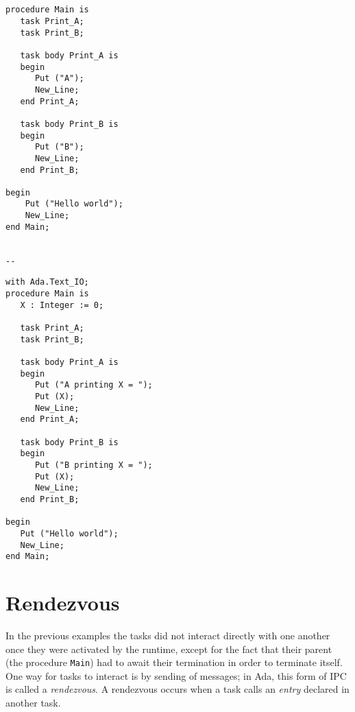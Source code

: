 \begin{minipage}{0.45\linewidth}
\lstset{language=ada}
\begin{lstlisting}[caption=Tasks in a procedure.,label=tasks_in_proc]


procedure Main is
   task Print_A;
   task Print_B;

   task body Print_A is
   begin
      Put ("A");
      New_Line;
   end Print_A;

   task body Print_B is
   begin
      Put ("B");
      New_Line;
   end Print_B;

begin
	Put ("Hello world");
	New_Line;
end Main;


--
\end{lstlisting}
\end{minipage}
\hspace{5mm}
\begin{minipage}{0.45\linewidth}
\lstset{language=ada}
\begin{lstlisting}[caption=Sharing of data in tasks.,label=shared_data]
with Ada.Text_IO;
procedure Main is
   X : Integer := 0;

   task Print_A;
   task Print_B;

   task body Print_A is
   begin
      Put ("A printing X = ");
      Put (X);
      New_Line;
   end Print_A;

   task body Print_B is
   begin
      Put ("B printing X = ");
      Put (X);
      New_Line;
   end Print_B;

begin
   Put ("Hello world");
   New_Line;
end Main;
\end{lstlisting}
\end{minipage}

\section{Rendezvous}
In the previous examples the tasks did not interact directly with one
another once they were activated by the runtime, except for the fact
that their parent (the procedure \texttt{Main}) had to await their
termination in order to terminate itself. One way for tasks to
interact is by sending of messages; in Ada, this form of IPC is called
a \emph{rendezvous}. A rendezvous occurs when a task calls an
\emph{entry} declared in another task.

